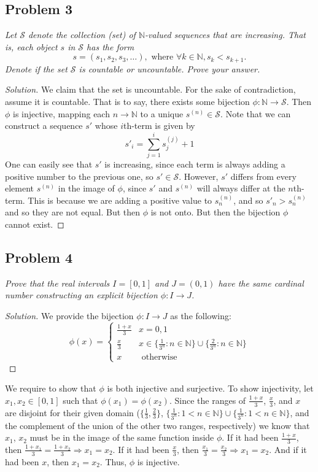\documentclass{article}
\newcommand{\N}{{\mathbb N}}
\begin{document}
\subsection*{Problem 3}
{\it Let $\mathcal{S}$ denote the collection (set) of $\N$-valued
sequences that are increasing.
That is, each object $s$ in $\mathcal{S}$ has the form
\[s = (s_1, s_2, s_3, \dots), \text{ where } \forall k \in \N, s_k < s_{k+1}.\]
Denote if the set $\mathcal{S}$ is countable or uncountable.
Prove your answer.
}
\begin{proof}[Solution]\let\qed\relax
	We claim that the set is uncountable.
	For the sake of contradiction, assume it is countable.
	That is to say, there exists some bijection $\phi \colon \N \to \mathcal{S}$.
	Then $\phi$ is injective,
	mapping each $n \to \N$ to a unique $s^{(n)} \in \mathcal{S}$.
	Note that we can construct a sequence $s'$ whose $i$th-term is given by
	\[s'_i = \sum_{j = 1}^i s_{j}^{(j)} + 1\]
	One can easily see that $s'$ is increasing,
	since each term is always adding a positive number to the previous one,
	so $s' \in \mathcal{S}$.
	However, $s'$ differs from every element $s^{(n)}$ in the image of $\phi$,
	since $s'$ and $s^{(n)}$ will always differ at the $n$th-term.
	This is because we are adding a positive value to $s_n^{(n)}$,
	and so $s'_n > s_n^{(n)}$ and so they are not equal.
	But then $\phi$ is not onto.
	But then the bijection $\phi$ cannot exist.
\end{proof}
\clearpage

\subsection*{Problem 4}
{\it Prove that the real intervals $I = [0,1]$ and $J=(0,1)$
have the same cardinal number constructing
an explicit bijection $\phi \colon I \to J$.}
\begin{proof}[Solution]\let\qed\relax
	We provide the bijection $\phi \colon I \to J$ as the following:
	\[\phi(x) = \begin{cases}
		\frac{1+x}{3} & x=0,1\\
		\frac{x}{3} & x\in\{\frac{1}{3^n} \colon n\in\N\}
		\cup \{\frac{2}{3^n} \colon n \in \N\}\\
		x & \text{ otherwise}
	\end{cases}\]
\end{proof}
We require to show that $\phi$ is both injective and surjective.
To show injectivity, let $x_1,x_2 \in [0,1]$ such that $\phi(x_1) = \phi(x_2)$.
Since the ranges of $\frac{1+x}{3}$, $\frac{x}{3}$, and $x$
are disjoint for their given domain
($\{\frac{1}{3},\frac{2}{3}\}$,
$\{\frac{1}{3^n} \colon 1<n\in\N\}
\cup \{\frac{1}{3^n} \colon 1<n\in\N\}$,
and the complement of the union of the other two ranges, respectively)
we know that $x_1$, $x_2$ must be in the image of the same function inside $\phi$.
If it had been $\frac{1+x}{3}$, then $\frac{1+x_1}{3} = \frac{1+x_2}{3} \Rightarrow x_1=x_2$.
If it had been $\frac{x}{3}$, then $\frac{x_1}{3} = \frac{x_2}{3} \Rightarrow x_1 = x_2$.
And if it had been $x$, then $x_1 = x_2$.
Thus, $\phi$ is injective.
\end{document}
